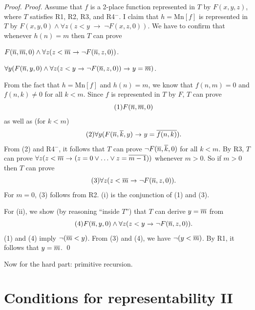 \begin{proof}
  \emph{Proof.}
  Assume that $f$ is a 2-place function represented in $T$ by $F(x,y,z)$,
  where $T$ satisfies R1, R2, R3, and R4$^{-}$.
  I claim that $h = \mathrm{Mn}[f]$ is represented in $T$ by
  $F(x,y,0) \land \forall z(z < y \;\to\; \neg F(x,z,0))$.
  We have to confirm that
  whenever $h(n) = m$ then $T$ can prove
  \begin{cenumerate}
    \item[(i)] $F(\num{n},\num{m},0) \land \forall z(z < \num{m} \,\to\, \neg F(\num{n},z,0))$.
    \item[(ii)] $\forall y(F(\num{n},y,0) \land \forall z(z < y \,\to\, \neg F(\num{n},z,0)) \,\to\, y = \num{m})$.
  \end{cenumerate}

  From the fact that $h = \mathrm{Mn}[f]$ and $h(n) = m$, we know that
  $f(n,m) = 0$ and $f(n,k) \neq 0$ for all $k < m$.
  Since $f$ is represented in $T$ by $F$,
  $T$ can prove
  \begin{equation}\tag{1}
    F(\overline{n},\overline{m},0)
  \end{equation}
  as well as (for $k<m$)
  \begin{equation}\tag{2}
    \forall y(F(\num{n},\num{k},y) \,\to\, y = \num{f(n,k)}).
  \end{equation}
  From (2) and R4$^{-}$,
  it follows that $T$ can prove $\neg F(\overline{n},\overline{k},0)$ for all $k < m$.
  By R3,
  $T$ can prove
  $\forall z(z < \num{m} \,\to\, (z = 0 \lor \ldots \lor z = \num{m-1}))$
  whenever $m > 0$.
  So if $m>0$ then  $T$ can prove
  \begin{equation}\tag{3}
    \forall z(z < \num{m} \,\to\, \neg F(\num{n},z,0)).
  \end{equation}
  For $m = 0$,
  (3) follows from R2.
  (i) is the conjunction of (1) and (3).

  For (ii),
  we show (by reasoning ``inside $T$'') that $T$ can derive $y = \overline{m}$ from
  \begin{equation}\tag{4}
    F(\num{n},y,0) \land \forall z(z < y \,\to\, \neg F(\num{n},z,0)).
  \end{equation}
  (1) and (4) imply $\neg (\overline{m} < y)$.
  From (3) and (4), we have $\neg (y < \overline{m})$.
  By R1, it follows that $y = \overline{m}$.
  \qed
\end{proof}

Now for the hard part: primitive recursion.

\section{Conditions for representability II}

